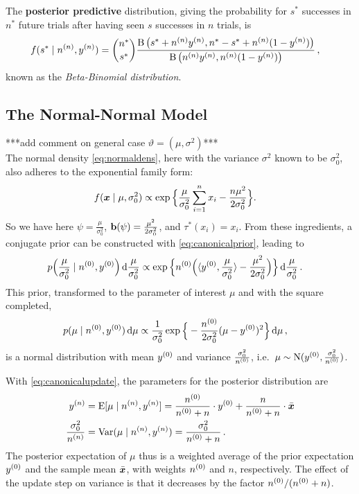 The \textbf{posterior predictive} distribution, giving the probability for $s^*$ successes in $n^*$ future trials
after having seen $s$ successes in $n$ trials, is
\begin{align*}
f(s^* \mid n^{(n)}, y^{(n)}) &= {n^* \choose s^*} \frac{\operatorname{B}\big(s^* + n^{(n)} y^{(n)}, n^* - s^* + n^{(n)} (1 - y^{(n)})\big)}{\operatorname{B}\big(n^{(n)}y^{(n)}, n^{(n)} (1 - y^{(n)})\big)}\,,
\end{align*}
known as the \emph{Beta-Binomial distribution}.


\subsection{The Normal-Normal Model}
\label{sec:norm-norm}

***add comment on general case $\vartheta=(\mu,\sigma^2)$***\\
The normal density \eqref{eq:normaldens}, here with the variance $\sigma^2$ known to be $\sigma^2_0$,
also adheres to the exponential family form:
\begin{align*}
f({\bm x} \mid \mu, \sigma_0^2)
 &\propto \exp\Big\{ \frac{\mu}{\sigma_0^2} \sum_{i=1}^n x_i - \frac{n\mu^2}{2\sigma_0^2} \Big\}.
\end{align*}
So we have here $\psi = \frac{\mu}{\sigma_0^2}$, $\mathbf{b}(\psi) = \frac{\mu^2}{2\sigma_0^2}$, and $\tau^*(x_i) = x_i$.
From these ingredients, a conjugate prior can be constructed with \eqref{eq:canonicalprior}, leading to
\begin{align*}
p\Big(\frac{\mu}{\sigma_0^2} \mid n^{(0)}, y^{(0)}\Big) \,\mathrm{d}\frac{\mu}{\sigma_0^2}
 &\propto \exp\Big\{ n^{(0)} \Big( \langle y^{(0)}, \frac{\mu}{\sigma_0^2} \rangle - \frac{\mu^2}{2\sigma_0^2} \Big) \Big\} \,\mathrm{d}\frac{\mu}{\sigma_0^2}\,.
\end{align*}
This prior, transformed to the parameter of interest $\mu$ and with the square completed,
\begin{align*}
p(\mu \mid n^{(0)}, y^{(0)}) \,\mathrm{d}\mu
 &\propto \frac{1}{\sigma_0^2} \exp\Big\{ -\frac{n^{(0)}}{2\sigma_0^2} (\mu - y^{(0)})^2 \Big\} \,\mathrm{d}\mu\,,
\end{align*}
is a normal distribution with mean $y^{(0)}$ and variance $\frac{\sigma_0^2}{n^{(0)}}$,
i.e.\ $\mu \sim \operatorname{N}(y^{(0)}, \frac{\sigma_0^2}{n^{(0)}})$.

With \eqref{eq:canonicalupdate}, the parameters for the posterior distribution are
\begin{align}
y^{(n)} &= \operatorname{E}[\mu\mid n^{(n)}, y^{(n)}] = \frac{n^{(0)}}{n^{(0)} + n} \cdot y^{(0)} + \frac{n}{n^{(0)} + n} \cdot \bar{{\bm x}} \label{eq:normalposte}\\
\frac{\sigma_0^2}{n^{(n)}} &= \operatorname{Var}(\mu\mid n^{(n)}, y^{(n)}) = \frac{\sigma_0^2}{n^{(0)} + n}\,. \label{eq:normalpostvar}
\end{align}
The posterior expectation of $\mu$ thus is a weighted average of the prior expectation $y^{(0)}$ and the sample mean $\bar{{\bm x}}$,
with weights $n^{(0)}$ and $n$, respectively.
The effect of the update step on variance is that it decreases by the factor $n^{(0)}/(n^{(0)}+n)$.

